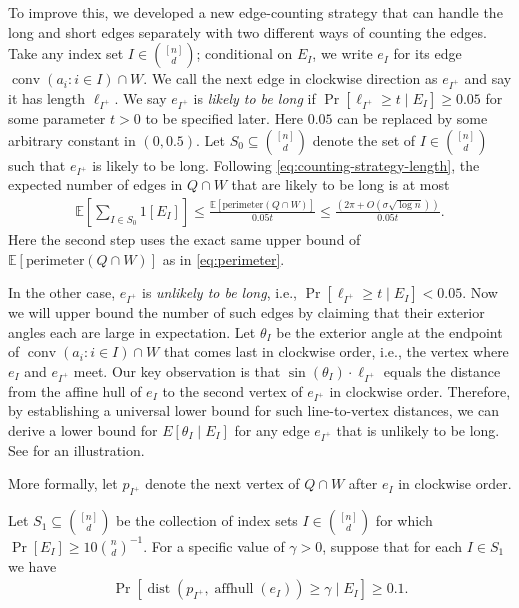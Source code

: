 \documentclass{theoretics}
\newcommand{\E}{\mathbb E}
\newcommand{\aff}{\operatorname{affhull}}
\newcommand{\conv}{\operatorname{conv}}
\newcommand{\dist}{\operatorname{dist}}
\begin{document}
To improve this, we developed a new edge-counting strategy that can handle the long and short edges separately with two different ways of counting the edges. 
Take any index set $I \in \binom{[n]}{d}$; conditional on $E_I$, we write $e_I$ for its edge $\conv(a_i : i \in I) \cap W$.
We call the next edge in clockwise direction as $e_{I^+}$ and say it has length $\ell_{I^+}$.
We say $e_{I^+}$ is \emph{likely to be long} if $\Pr[\ell_{I^+} \geq t \mid E_I] \geq 0.05$ for some parameter $t > 0$ to be specified later. Here $0.05$ can be replaced by some arbitrary constant in $(0, 0.5)$.
Let $S_0 \subseteq \binom{[n]}{d}$ denote the set of $I \in \binom{[n]}{d}$ such that $e_{I^+}$ is likely to be long.
Following \eqref{eq:counting-strategy-length}, the expected number of edges in $Q \cap W$ that are likely to be long is at most
\begin{align}
    \E[\sum_{I \in S_0} 1[E_I]] \leq \frac{\E[\mathrm{perimeter}(Q \cap W)]}{0.05 t} \leq \frac{(2\pi + O(\sigma \sqrt{\log n}))}{0.05 t}.
    \label{eq:ub-long-edges}
\end{align}
Here the second step uses the exact same upper bound of $\E[\mathrm{perimeter}(Q \cap W)]$ as in \eqref{eq:perimeter}.

In the other case, $e_{I^+}$ is \emph{unlikely to be long}, i.e., $\Pr[\ell_{I^+} \geq t \mid E_I] < 0.05$. 
Now we will upper bound the number of such edges by claiming that their exterior angles each are large in expectation.
Let $\theta_I$ be the exterior angle at the endpoint of $\conv(a_i : i\in I)\cap W$ that comes last in clockwise order, i.e.,
the vertex where $e_I$ and $e_{I^+}$ meet.
% 
Our key observation is that $\sin(\theta_I) \cdot \ell_{I^+}$ equals the distance from the affine hull of $e_I$ to the second vertex of $e_{I^+}$ in clockwise order. Therefore, by establishing a universal lower bound for such line-to-vertex distances, we can derive a lower bound for $E[\theta_I \mid E_I]$ for any edge $e_{I^+}$ that is unlikely to be long.
See  for an illustration.

More formally,
let $p_{I^+}$ denote the next vertex of $Q \cap W$ after $e_I$ in clockwise order.

Let $S_1 \subseteq \binom{[n]}{d}$ be the collection of index sets $I \in \binom{[n]}{d}$ for which $\Pr[E_I] \geq 10 \binom{n}{d}^{-1}$. For a specific value of $\gamma > 0$, suppose that for each $I \in S_1$ we have
\begin{align}
    \Pr[\dist(p_{I^+}, \aff(e_I)) \geq \gamma \mid E_I] \geq 0.1 . \label{eq:gamma}
\end{align}
\end{document}
